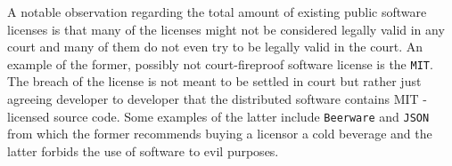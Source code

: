 A notable observation regarding the total amount of existing public software licenses is that many of the licenses might not be considered legally valid in any court and many of them do not even try to be legally valid in the court. An example of the former, possibly not court-fireproof software license is the \texttt{MIT}. The breach of the license is not meant to be settled in court but rather just agreeing developer to developer that the distributed software contains MIT -licensed source code. Some examples of the latter include \texttt{Beerware} and \texttt{JSON} from which the former recommends buying a licensor a cold beverage and the latter forbids the use of software to evil purposes. 
